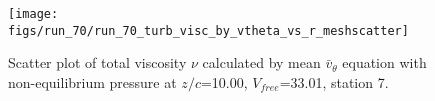 \begin{figure}[H]
\centering
\texttt{[image: figs/run\_70/run\_70\_turb\_visc\_by\_vtheta\_vs\_r\_meshscatter]}
\caption{Scatter plot of total viscosity $\nu$ calculated by mean $\bar{v}_{\theta}$ equation with non-equilibrium pressure at $z/c$=10.00, $V_{free}$=33.01, station 7.}
\label{fig:run_70_turb_visc_by_vtheta_vs_r_meshscatter}
\end{figure}


